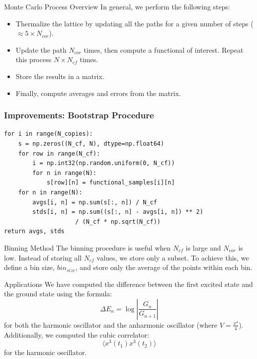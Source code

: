 \documentclass{beamer}
\begin{document}
\begin{frame}{Monte Carlo Process Overview}
    In general, we perform the following steps:
    \begin{itemize}
        \item Thermalize the lattice by updating all the paths for a given number of steps ($\approx 5 \times N_{cor}$).
        \item Update the path $N_{cor}$ times, then compute a functional of interest. Repeat this process $N \times N_{cf}$ times.
        \item Store the results in a matrix.
        \item Finally, compute averages and errors from the matrix.
    \end{itemize}
\end{frame}

\begin{frame}[fragile]
    \frametitle{Improvements: Bootstrap Procedure}
    \begin{verbatim}
for i in range(N_copies):
    s = np.zeros((N_cf, N), dtype=np.float64)
    for row in range(N_cf):
        i = np.int32(np.random.uniform(0, N_cf))
        for n in range(N):
            s[row][n] = functional_samples[i][n]
    for n in range(N):
        avgs[i, n] = np.sum(s[:, n]) / N_cf
        stds[i, n] = np.sum((s[:, n] - avgs[i, n]) ** 2)
                    / (N_cf * np.sqrt(N_cf))
return avgs, stds
    \end{verbatim}
\end{frame}

\begin{frame}{Binning Method}
    The binning procedure is useful when $N_{cf}$ is large and $N_{cor}$ is low. Instead of storing all $N_{cf}$ values, we store only a subset. To achieve this, we define a bin size, $bin_{size}$, and store only the average of the points within each bin.
\end{frame}

\begin{frame}{Applications}
    We have computed the difference between the first excited state and the ground state using the formula:
    \begin{equation*}
        \Delta E_n = \log \left| \frac{G_n}{G_{n+1}} \right|
    \end{equation*}
    for both the harmonic oscillator and the anharmonic oscillator (where $V = \frac{x^4}{4}$). Additionally, we computed the cubic correlator:
    \begin{equation*}
        \langle x^3(t_1)x^3(t_2) \rangle
    \end{equation*}
    for the harmonic oscillator.
\end{frame}
\end{document}
